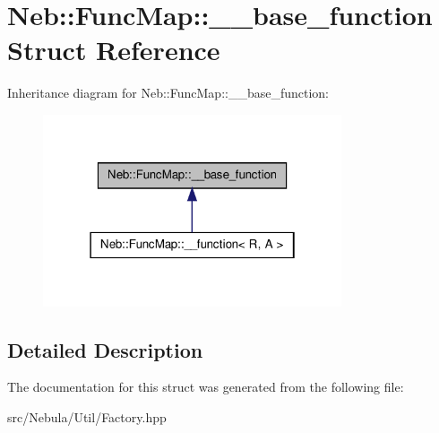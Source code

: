 \hypertarget{structNeb_1_1FuncMap_1_1____base__function}{\section{\-Neb\-:\-:\-Func\-Map\-:\-:\-\_\-\-\_\-base\-\_\-function \-Struct \-Reference}
\label{structNeb_1_1FuncMap_1_1____base__function}
}


\-Inheritance diagram for \-Neb\-:\-:\-Func\-Map\-:\-:\-\_\-\-\_\-base\-\_\-function\-:\nopagebreak
\begin{figure}[H]
\begin{center}
\leavevmode
\includegraphics[width=250pt]{structNeb_1_1FuncMap_1_1____base__function__inherit__graph}
\end{center}
\end{figure}


\subsection{\-Detailed \-Description}


\-The documentation for this struct was generated from the following file\-:\begin{DoxyCompactItemize}
\item 
src/\-Nebula/\-Util/\-Factory.\-hpp\end{DoxyCompactItemize}
